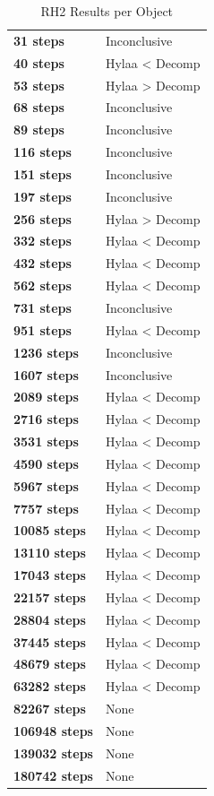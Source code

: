 \documentclass{article}\usepackage[]{graphicx}\usepackage[]{color}
\begin{document}
	
	\begin{table}[H]
	\centering
	\caption{RH2 Results per Object}
	\begin{tabular}{ll}
	\textbf{31 steps} & Inconclusive \\
	\textbf{40 steps} & Hylaa \textless{} Decomp \\
	\textbf{53 steps} & Hylaa \textgreater{} Decomp \\
	\textbf{68 steps} & Inconclusive \\
	\textbf{89 steps} & Inconclusive \\
	\textbf{116 steps} & Inconclusive \\
	\textbf{151 steps} & Inconclusive \\
	\textbf{197 steps} & Inconclusive \\
	\textbf{256 steps} & Hylaa \textgreater{} Decomp \\
	\textbf{332 steps} & Hylaa \textless{} Decomp \\
	\textbf{432 steps} & Hylaa \textless{} Decomp \\
	\textbf{562 steps} & Hylaa \textless{} Decomp \\
	\textbf{731 steps} & Inconclusive \\
	\textbf{951 steps} & Hylaa \textless{} Decomp \\
	\textbf{1236 steps} & Inconclusive \\
	\textbf{1607 steps} & Inconclusive \\
	\textbf{2089 steps} & Hylaa \textless{} Decomp \\
	\textbf{2716 steps} & Hylaa \textless{} Decomp \\
	\textbf{3531 steps} & Hylaa \textless{} Decomp \\
	\textbf{4590 steps} & Hylaa \textless{} Decomp \\
	\textbf{5967 steps} & Hylaa \textless{} Decomp \\
	\textbf{7757 steps} & Hylaa \textless{} Decomp \\
	\textbf{10085 steps} & Hylaa \textless{} Decomp \\
	\textbf{13110 steps} & Hylaa \textless{} Decomp \\
	\textbf{17043 steps} & Hylaa \textless{} Decomp \\
	\textbf{22157 steps} & Hylaa \textless{} Decomp \\
	\textbf{28804 steps} & Hylaa \textless{} Decomp \\
	\textbf{37445 steps} & Hylaa \textless{} Decomp \\
	\textbf{48679 steps} & Hylaa \textless{} Decomp \\
	\textbf{63282 steps} & Hylaa \textless{} Decomp \\
	\textbf{82267 steps} & None \\
	\textbf{106948 steps} & None \\
	\textbf{139032 steps} & None \\
	\textbf{180742 steps} & None \\
	\end{tabular}
	\end{table}
\end{document}
